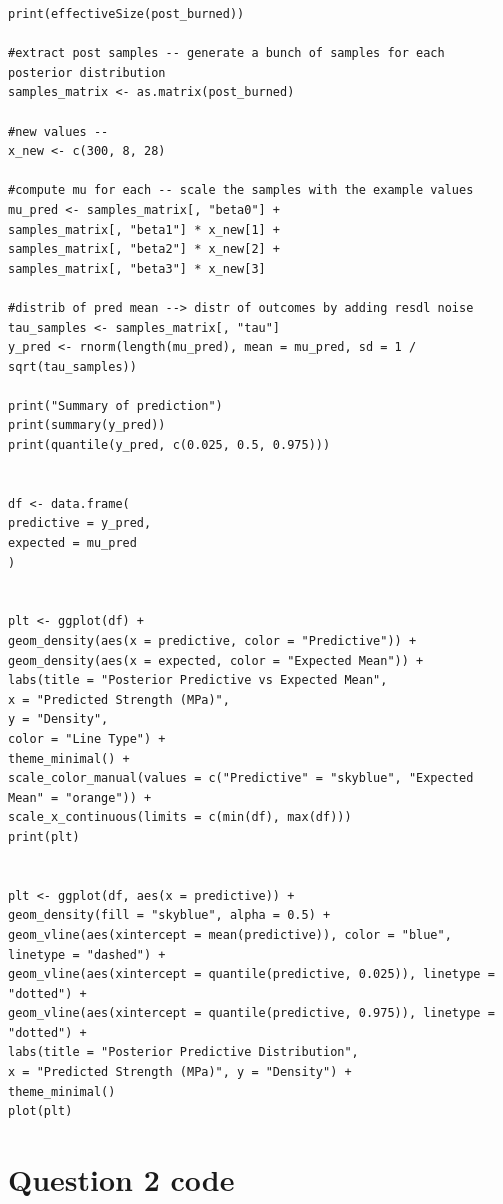 \documentclass[]{article}
\begin{document}
\begin{lstlisting}
print(effectiveSize(post_burned))

#extract post samples -- generate a bunch of samples for each posterior distribution
samples_matrix <- as.matrix(post_burned)

#new values --
x_new <- c(300, 8, 28)

#compute mu for each -- scale the samples with the example values
mu_pred <- samples_matrix[, "beta0"] +
samples_matrix[, "beta1"] * x_new[1] +
samples_matrix[, "beta2"] * x_new[2] +
samples_matrix[, "beta3"] * x_new[3]

#distrib of pred mean --> distr of outcomes by adding resdl noise
tau_samples <- samples_matrix[, "tau"]
y_pred <- rnorm(length(mu_pred), mean = mu_pred, sd = 1 / sqrt(tau_samples))

print("Summary of prediction")
print(summary(y_pred))
print(quantile(y_pred, c(0.025, 0.5, 0.975)))


df <- data.frame(
predictive = y_pred,
expected = mu_pred
)


plt <- ggplot(df) +
geom_density(aes(x = predictive, color = "Predictive")) +
geom_density(aes(x = expected, color = "Expected Mean")) +
labs(title = "Posterior Predictive vs Expected Mean",
x = "Predicted Strength (MPa)",
y = "Density",
color = "Line Type") +
theme_minimal() +
scale_color_manual(values = c("Predictive" = "skyblue", "Expected Mean" = "orange")) +
scale_x_continuous(limits = c(min(df), max(df)))
print(plt)


plt <- ggplot(df, aes(x = predictive)) +
geom_density(fill = "skyblue", alpha = 0.5) +
geom_vline(aes(xintercept = mean(predictive)), color = "blue", linetype = "dashed") +
geom_vline(aes(xintercept = quantile(predictive, 0.025)), linetype = "dotted") +
geom_vline(aes(xintercept = quantile(predictive, 0.975)), linetype = "dotted") +
labs(title = "Posterior Predictive Distribution",
x = "Predicted Strength (MPa)", y = "Density") +
theme_minimal()
plot(plt)	
\end{lstlisting}


\section{Question 2 code}
\end{document}
